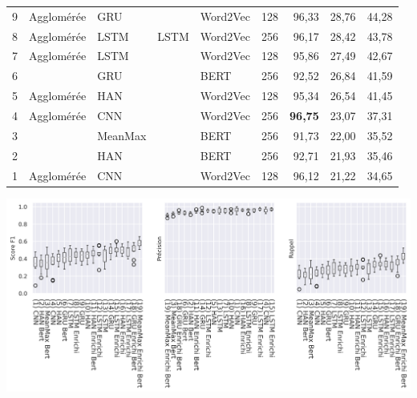 \begin{minipage}{\linewidth}
{\begin{tabular}{r|lllll|rrr}
         9 &  Agglomérée &      GRU &                &   Word2Vec &            128 &      96,33 &   28,76 &     44,28 \\
         8 &  Agglomérée &     LSTM &           LSTM &   Word2Vec &            256 &      96,17 &   28,42 &     43,78 \\
         7 &  Agglomérée &     LSTM &                &   Word2Vec &            128 &      95,86 &   27,49 &     42,67 \\
         6 &             &      GRU &                &       BERT &            256 &      92,52 &   26,84 &     41,59 \\
         5 &  Agglomérée &      HAN &                &   Word2Vec &            128 &      95,34 &   26,54 &     41,45 \\
         4 &  Agglomérée &      CNN &                &   Word2Vec &            256 &      \textbf{96,75} &   23,07 &     37,31 \\
         3 &             &  MeanMax &                &       BERT &            256 &      91,73 &   22,00 &     35,52 \\
         2 &             &      HAN &                &       BERT &            256 &      92,71 &   21,93 &     35,46 \\
         1 &  Agglomérée &      CNN &                &   Word2Vec &            128 &      96,12 &   21,22 &     34,65 \\
    \bottomrule
    \end{tabular}%
    }
    \label{tab:chap4:metaphor-results}
    \includegraphics[width=\linewidth]{figures/chap4/metaphors-dispersionscores.png}
    \label{fig:chap4:metaphor-results-dispersion}
\end{minipage}


